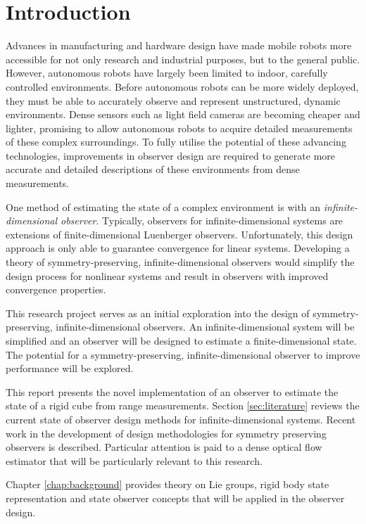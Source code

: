 \chapter{Introduction}

Advances in manufacturing and hardware design have made mobile robots more accessible for not only research and industrial purposes, but to the general public. However, autonomous robots have largely been limited to indoor, carefully controlled environments. Before autonomous robots can be more widely deployed, they must be able to accurately observe and represent unstructured, dynamic environments. Dense sensors such as light field cameras are becoming cheaper and lighter, promising to allow autonomous robots to acquire detailed measurements of these complex surroundings. To fully utilise the potential of these advancing technologies, improvements in observer design are required to generate more accurate and detailed descriptions of these environments from dense measurements.

One method of estimating the state of a complex environment is with an \textit{infinite-dimensional observer}. Typically, observers for infinite-dimensional systems are extensions of finite-dimensional Luenberger observers. Unfortunately, this design approach is only able to guarantee convergence for linear systems. Developing a theory of symmetry-preserving, infinite-dimensional observers would simplify the design process for nonlinear systems and result in observers with improved convergence properties.

This research project serves as an initial exploration into the design of symmetry-preserving, infinite-dimensional observers. An infinite-dimensional system will be simplified and an observer will be designed to estimate a finite-dimensional state. The potential for a symmetry-preserving, infinite-dimensional observer to improve performance will be explored. 

This report presents the novel implementation of an observer to estimate the state of a rigid cube from range measurements. Section \ref{sec:literature} reviews the current state of observer design methods for infinite-dimensional systems. Recent work in the development of design methodologies for symmetry preserving observers is described. Particular attention is paid to a dense optical flow estimator that will be particularly relevant to this research.
 
Chapter \ref{chap:background} provides theory on Lie groups, rigid body state representation and state observer concepts that will be applied in the observer design.

